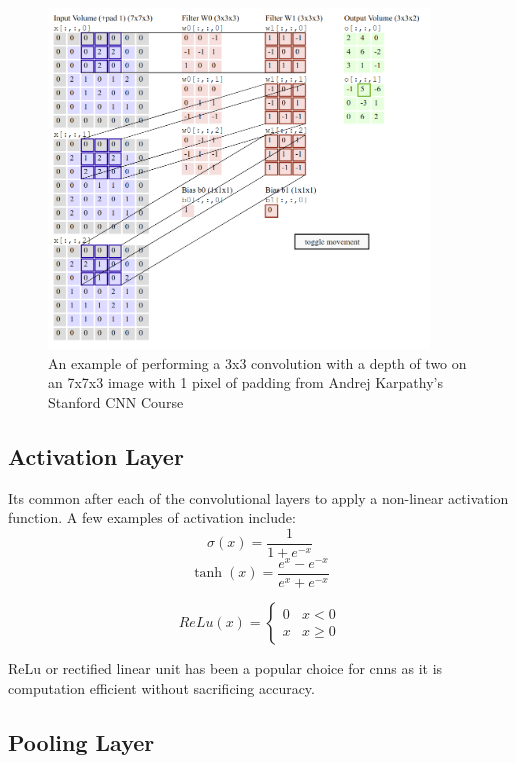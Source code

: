 \begin{figure}[ht]
\includegraphics[width=0.9\textwidth]{Figures/Convolution.png}
\caption{An example of performing a 3x3 convolution with a depth of two on an 7x7x3 image with 1 pixel of padding from Andrej Karpathy's Stanford CNN Course \cite{StanfordConv}}
\label{fig:Convolution}
\end{figure}

\subsection{Activation Layer}

Its common after each of the convolutional layers to apply a non-linear activation function. A few examples of activation include: \\

\[ \sigma(x) = \frac{1}{1+e^{-x}} \]
\[ \tanh(x) = \frac{e^x - e^{-x}}{e^x + e^{-x}} \]

\[ ReLu(x) = \begin{cases}
      0 & x < 0 \\
      x & x \geq 0
   \end{cases}
\]

ReLu or rectified linear unit has been a popular choice for cnns as it is computation efficient without sacrificing accuracy.

\subsection{Pooling Layer}

